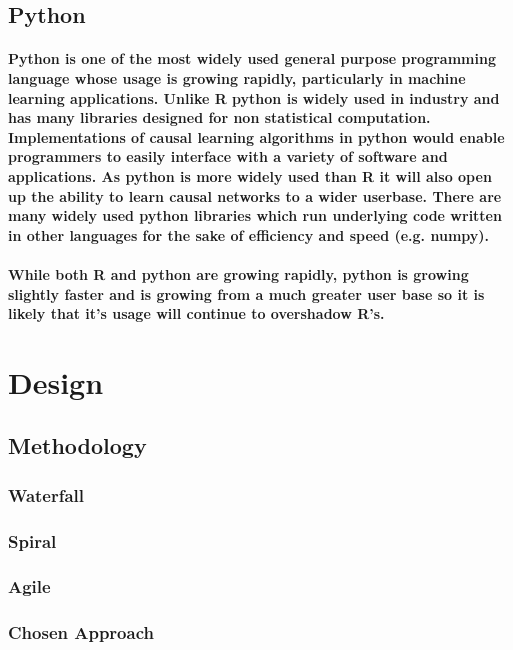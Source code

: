 \documentclass{article}
\begin{document}
\subsection{Python}

\paragraph{Python is one of the most widely used general purpose programming language whose usage is growing rapidly, particularly in machine learning applications. Unlike R python is widely used in industry and has many libraries designed for non statistical computation. Implementations of causal learning algorithms in python would enable programmers to easily interface with a variety of software and applications. As python is more widely used than R it will also open up the ability to learn causal networks to a wider userbase. There are many widely used python libraries which run underlying code written in other languages for the sake of efficiency and speed (e.g. numpy).}

\paragraph{While both R and python are growing rapidly, python is growing slightly faster and is growing from a much greater user base so it is likely that it's usage will continue to overshadow R's.}

\section{Design}

\subsection{Methodology}
\subsubsection{Waterfall}
\subsubsection{Spiral}
\subsubsection{Agile}
\subsubsection{Chosen Approach}
\end{document}
